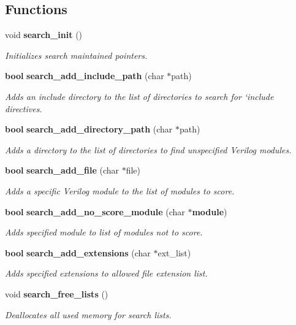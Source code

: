 \subsection*{Functions}
\begin{CompactItemize}
\item 
void {\bf search\_\-init} ()
\begin{CompactList}\small\item\em Initializes search maintained pointers.\item\end{CompactList}\item 
{\bf bool} {\bf search\_\-add\_\-include\_\-path} (char $\ast$path)
\begin{CompactList}\small\item\em Adds an include directory to the list of directories to search for `include directives.\item\end{CompactList}\item 
{\bf bool} {\bf search\_\-add\_\-directory\_\-path} (char $\ast$path)
\begin{CompactList}\small\item\em Adds a directory to the list of directories to find unspecified Verilog modules.\item\end{CompactList}\item 
{\bf bool} {\bf search\_\-add\_\-file} (char $\ast$file)
\begin{CompactList}\small\item\em Adds a specific Verilog module to the list of modules to score.\item\end{CompactList}\item 
{\bf bool} {\bf search\_\-add\_\-no\_\-score\_\-module} (char $\ast${\bf module})
\begin{CompactList}\small\item\em Adds specified module to list of modules not to score.\item\end{CompactList}\item 
{\bf bool} {\bf search\_\-add\_\-extensions} (char $\ast$ext\_\-list)
\begin{CompactList}\small\item\em Adds specified extensions to allowed file extension list.\item\end{CompactList}\item 
void {\bf search\_\-free\_\-lists} ()
\begin{CompactList}\small\item\em Deallocates all used memory for search lists.\item\end{CompactList}\end{CompactItemize}
